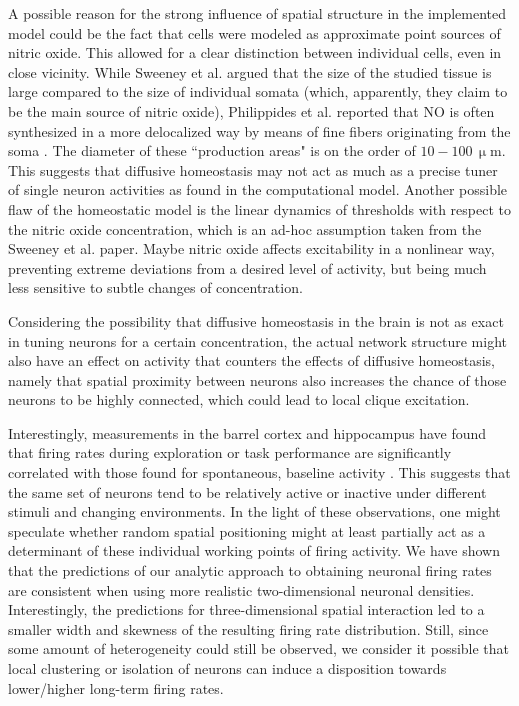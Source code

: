 \documentclass[10pt,letterpaper]{article}
\begin{document}
A possible reason for the strong influence of spatial structure in the implemented model could be the fact that cells were modeled as approximate point sources of nitric oxide. This allowed for a clear distinction between individual cells, even in close vicinity. While Sweeney et al. argued that the size of the studied tissue is large compared to the size of individual somata (which, apparently, they claim to be the main source of nitric oxide), Philippides et al. reported that NO is often synthesized in a more delocalized way by means of fine fibers originating from the soma \cite{Philippides_2005}. The diameter of these ``production areas" is on the order of $\mathrm{10-100\, \upmu m}$. This suggests that diffusive homeostasis may not act as much as a precise tuner of single neuron activities as found in the computational model. Another possible flaw of the homeostatic model is the linear dynamics of thresholds with respect to the nitric oxide concentration, which is an ad-hoc assumption taken from the Sweeney et al. paper. Maybe nitric oxide affects excitability in a nonlinear way, preventing extreme deviations from a desired level of activity, but being much less sensitive to subtle changes of concentration.

Considering the possibility that diffusive homeostasis in the brain is not as exact in tuning neurons for a certain concentration, the actual network structure might also have an effect on activity that counters the effects of diffusive homeostasis, namely that spatial proximity between neurons also increases the chance of those neurons to be highly connected, which could lead to local clique excitation.

Interestingly, measurements in the barrel cortex and hippocampus have found that firing rates during exploration or task performance are significantly correlated with those found for spontaneous, baseline activity \cite{OConnor_2010,Mizuseki_2013}. This suggests that the same set of neurons tend to be relatively active or inactive under different stimuli and changing environments. In the light of these observations, one might speculate whether random spatial positioning might at least partially act as a determinant of these individual working points of firing activity. We have shown that the predictions of our analytic approach to obtaining neuronal firing rates are consistent when using more realistic two-dimensional neuronal densities. Interestingly, the predictions for three-dimensional spatial interaction led to a smaller width and skewness of the resulting firing rate distribution. Still, since some amount of heterogeneity could still be observed, we consider it possible that local clustering or isolation of neurons can induce a disposition towards lower/higher long-term firing rates.
\end{document}
